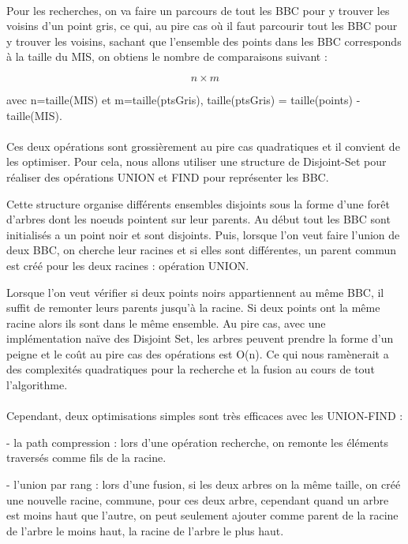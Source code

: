 \paragraph{}
Pour les recherches, on va faire un parcours de tout les BBC pour y trouver les voisins d'un point gris, ce qui, au pire cas où il faut parcourir tout les BBC pour y trouver les voisins, sachant que l'ensemble des points dans les BBC corresponds à la taille du MIS, on obtiens le nombre de comparaisons suivant :

\[
n \times m
\]

avec n=taille(MIS) et m=taille(ptsGris), taille(ptsGris) = taille(points) - taille(MIS).

\paragraph{}
Ces deux opérations sont grossièrement au pire cas quadratiques et il convient de les optimiser. Pour cela, nous allons utiliser une structure de Disjoint-Set pour réaliser des opérations UNION et FIND pour représenter les BBC.

Cette structure organise différents ensembles disjoints sous la forme d'une forêt d'arbres dont les noeuds pointent sur leur parents. Au début tout les BBC sont initialisés a un point noir et sont disjoints. Puis, lorsque l'on veut faire l'union de deux BBC, on cherche leur racines et si elles sont différentes, un parent commun est créé pour les deux racines : opération UNION.

Lorsque l'on veut vérifier si deux points noirs appartiennent au même BBC, il suffit de remonter leurs parents jusqu'à la racine. Si deux points ont la même racine alors ils sont dans le même ensemble.
Au pire cas, avec une implémentation naïve des Disjoint Set, les arbres peuvent prendre la forme d'un peigne et le coût au pire cas des opérations est O(n). Ce qui nous ramènerait a des complexités quadratiques pour la recherche et la fusion au cours de tout l'algorithme.

\paragraph{}
Cependant, deux optimisations simples sont très efficaces avec les UNION-FIND :

- la path compression : lors d'une opération recherche, on remonte les éléments traversés comme fils de la racine.

- l'union par rang : lors d'une fusion, si les deux arbres on la même taille, on créé une nouvelle racine, commune, pour ces deux arbre, cependant quand un arbre est moins haut que l'autre, on peut seulement ajouter comme parent de la racine de l'arbre le moins haut, la racine de l'arbre le plus haut.

